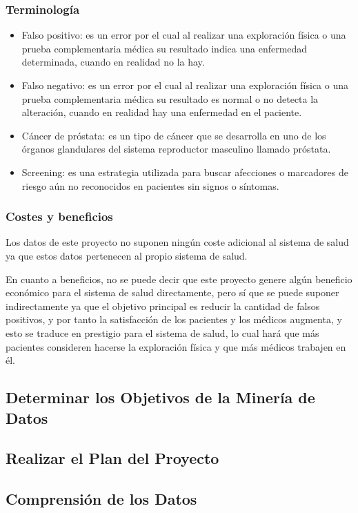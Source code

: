 \documentclass{article}
\begin{document}
\subsubsection{Terminología}

\begin{itemize}
	\item Falso positivo: es un error por el cual al realizar una exploración física o una prueba complementaria médica su resultado indica una enfermedad determinada, cuando en realidad no la hay.
	\item Falso negativo: es un error por el cual al realizar una exploración física o una prueba complementaria médica su resultado es normal o no detecta la alteración, cuando en realidad hay una enfermedad en el paciente.
	\item Cáncer de próstata: es un tipo de cáncer que se desarrolla en uno de los órganos glandulares del sistema reproductor masculino llamado próstata.
	\item Screening: es una estrategia utilizada para buscar afecciones o marcadores de riesgo aún no reconocidos en pacientes sin signos o síntomas.
\end{itemize}

\subsubsection{Costes y beneficios}
Los datos de este proyecto no suponen ningún coste adicional al sistema de salud ya que estos datos pertenecen al propio sistema de salud.

En cuanto a beneficios, no se puede decir que este proyecto genere algún beneficio económico para el sistema de salud directamente, pero sí que se puede suponer indirectamente ya que el objetivo principal es reducir la cantidad de falsos positivos, y por tanto la satisfacción de los pacientes y los médicos augmenta, y esto se traduce en prestigio para el sistema de salud, lo cual hará que más pacientes consideren hacerse la exploración física y que más médicos trabajen en él.

\subsection{Determinar los Objetivos de la Minería de Datos}
\subsection{Realizar el Plan del Proyecto}
\subsection{Comprensión de los Datos}
\end{document}
